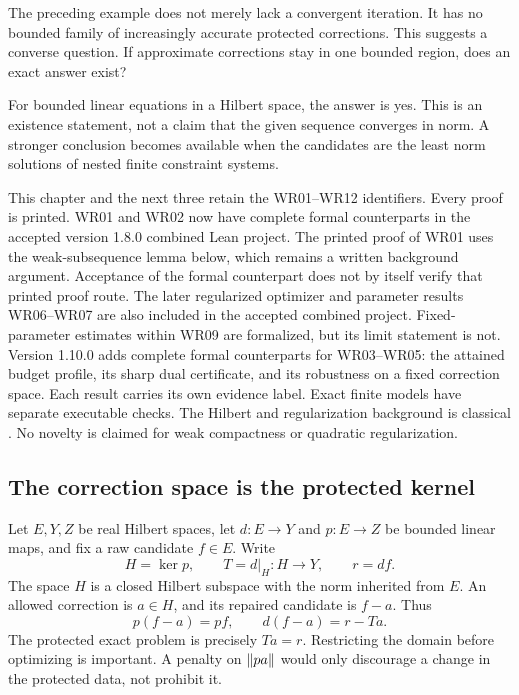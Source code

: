 \clearpage
{}\label{sec:bounded-realization}
The preceding example does not merely lack a convergent iteration. It has no bounded family of increasingly accurate protected corrections. This suggests a converse question. If approximate corrections stay in one bounded region, does an exact answer exist?

For bounded linear equations in a Hilbert space, the answer is yes. This is an existence statement, not a claim that the given sequence converges in norm. A stronger conclusion becomes available when the candidates are the least norm solutions of nested finite constraint systems.

\begin{scopebox}
This chapter and the next three retain the WR01--WR12 identifiers. Every proof is printed. WR01 and WR02 now have complete formal counterparts in the accepted version 1.8.0 combined Lean project. The printed proof of WR01 uses the weak-subsequence lemma below, which remains a written background argument. Acceptance of the formal counterpart does not by itself verify that printed proof route. The later regularized optimizer and parameter results WR06--WR07 are also included in the accepted combined project. Fixed-parameter estimates within WR09 are formalized, but its limit statement is not. Version 1.10.0 adds complete formal counterparts for WR03--WR05: the attained budget profile, its sharp dual certificate, and its robustness on a fixed correction space. Each result carries its own evidence label. Exact finite models have separate executable checks. The Hilbert and regularization background is classical \cite{clason-inverse}. No novelty is claimed for weak compactness or quadratic regularization.
\end{scopebox}

\subsection{The correction space is the protected kernel}
Let $E,Y,Z$ be real Hilbert spaces, let $d:E\to Y$ and $p:E\to Z$ be bounded linear maps, and fix a raw candidate $f\in E$. Write
\[
 H=\ker p,\qquad T=d|_H:H\to Y,\qquad r=df.
\]
The space $H$ is a closed Hilbert subspace with the norm inherited from $E$. An allowed correction is $a\in H$, and its repaired candidate is $f-a$. Thus
\[
 p(f-a)=pf,\qquad d(f-a)=r-Ta.
\]
The protected exact problem is precisely $Ta=r$. Restricting the domain before optimizing is important. A penalty on $\left\lVert pa\right\rVert$ would only discourage a change in the protected data, not prohibit it.

